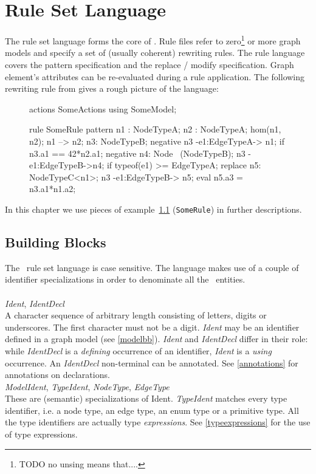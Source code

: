 \chapter{Rule Set Language}

The rule set language forms the core of \GrG. Rule files refer to zero\footnote{TODO no unsing means that....} or more graph models and specify a set of (usually coherent) rewriting rules. The rule language covers the pattern specification and the replace / modify specification. Graph element's attributes can be re-evaluated during a rule application. The following rewriting rule from \cite{geiss} gives a rough picture of the language:
\begin{figure}[htbf]
\begin{example}\label{ex:rule:SomeRule}
\begin{grgen}
actions SomeActions using SomeModel;

rule SomeRule {
  pattern {
    n1 : NodeTypeA;
    n2 : NodeTypeA;
    hom(n1, n2);
    n1 --> n2;
    n3: NodeTypeB;
    negative {
      n3 -e1:EdgeTypeA-> n1;
      if {n3.a1 == 42*n2.a1;}
    }
    negative {
      n4: Node \ (NodeTypeB);
      n3 -e1:EdgeTypeB->n4;
      if {typeof(e1) >= EdgeTypeA;}
    }
  }
  replace {
    n5: NodeTypeC<n1>;
    n3 -e1:EdgeTypeB-> n5;
    eval {
      n5.a3 = n3.a1*n1.a2;
    }
  }  
}
\end{grgen}
\end{example}
\end{figure}
In this chapter we use pieces of example~\ref{ex:rule:SomeRule} (\texttt{SomeRule}) in further descriptions.

\section{Building Blocks}
\label{rulebb}

The \GrG\ rule set language is case sensitive. The language makes use of a couple of identifier specializations in order to denominate all the \GrG\ entities.\\
\\
\emph{Ident}, \emph{IdentDecl}\\ \nopagebreak
A character sequence of arbitrary length consisting of letters, digits or underscores. The first character must not be a digit. \emph{Ident} may be an identifier defined in a graph model (see \ref{modelbb}). \emph{Ident} and \emph{IdentDecl} differ in their role: while \emph{IdentDecl} is a \emph{defining} occurrence of an identifier, \emph{Ident} is a \emph{using} occurrence. An \emph{IdentDecl} non-terminal can be annotated. See \ref{annotations} for annotations on declarations.
\\
\emph{ModelIdent}, \emph{TypeIdent}, \emph{NodeType}, \emph{EdgeType}\\
These are (semantic) specializations of Ident. \emph{TypeIdent} matches every type identifier, i.e. a node type, an edge type, an enum type or a primitive type. All the type identifiers are actually type \emph{expressions}. See \ref{typeexpressions} for the use of type expressions.\\

